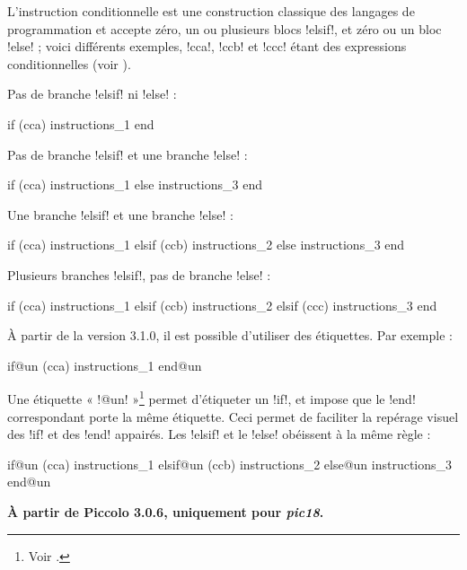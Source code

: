 
L'instruction conditionnelle est une construction classique des langages de programmation et accepte zéro, un ou plusieurs blocs \pic!elsif!, et zéro ou un bloc \pic!else! ; voici différents exemples, \pic!cca!, \pic!ccb! et \pic!ccc! étant des expressions conditionnelles (voir ).


Pas de branche \pic!elsif! ni \pic!else! :
\begin{piccolo}
if (cca)
  instructions_1
end
\end{piccolo}

Pas de branche \pic!elsif! et une branche \pic!else! :
\begin{piccolo}
if (cca)
  instructions_1
else
  instructions_3
end
\end{piccolo}

Une branche \pic!elsif! et une branche \pic!else! :
\begin{piccolo}
if (cca)
  instructions_1
elsif (ccb)
  instructions_2
else
  instructions_3
end
\end{piccolo}

Plusieurs branches \pic!elsif!, pas de branche \pic!else! :
\begin{piccolo}
if (cca)
  instructions_1
elsif (ccb)
  instructions_2
elsif (ccc)
  instructions_3
end
\end{piccolo}

À partir de la version 3.1.0, il est possible d'utiliser des étiquettes. Par exemple :
\begin{piccolo}
if@un (cca)
  instructions_1
end@un
\end{piccolo}

Une étiquette « \pic!@un! »\footnote{Voir .} permet d'étiqueter un \pic!if!, et impose que le \pic!end! correspondant porte la même étiquette. Ceci permet de faciliter la repérage visuel des  \pic!if! et des \pic!end! appairés. Les \pic!elsif! et le \pic!else! obéissent à la même règle :
\begin{piccolo}
if@un (cca)
  instructions_1
elsif@un (ccb)
  instructions_2
else@un
  instructions_3
end@un
\end{piccolo}




\textbf{À partir de Piccolo 3.0.6, uniquement pour \emph{pic18}.}

